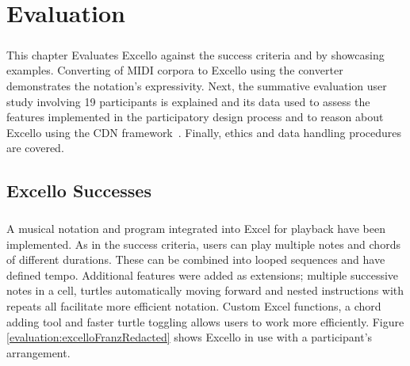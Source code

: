 

\newcommand{\mycbox}[1]{\tikz{\path[draw=#1,fill=#1] (0,0) rectangle (0.3cm,0.3cm);}}

\chapter{Evaluation}

\paragraph{} This chapter Evaluates Excello against the success criteria and by showcasing examples. Converting of MIDI corpora to Excello using the converter demonstrates the notation's expressivity. Next, the summative evaluation user study involving 19 participants is explained and its data used to assess the features implemented in the participatory design process and to reason about Excello using the CDN framework~\cite{blackwell:tutorial}. Finally, ethics and data handling procedures are covered.

\section{Excello Successes}

\paragraph{} A musical notation and program integrated into Excel for playback have been implemented. As in the success criteria, users can play multiple notes and chords of different durations. These can be combined into looped sequences and have defined tempo. Additional features were added as extensions; multiple successive notes in a cell, turtles automatically moving forward and nested instructions with repeats all facilitate more efficient notation. Custom Excel functions, a chord adding tool and faster turtle toggling allows users to work more efficiently. Figure \ref{evaluation:excelloFranzRedacted} shows Excello in use with a participant's arrangement.

